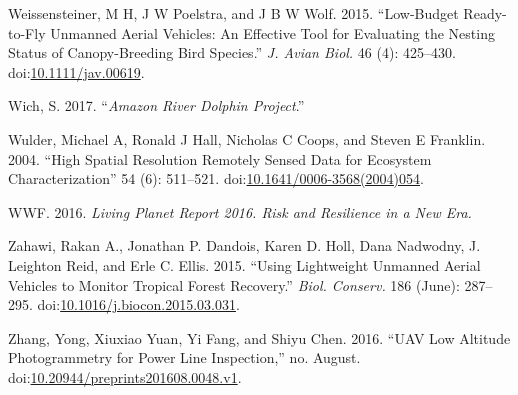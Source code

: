 \documentclass[]{interact}
\theoremstyle{plain}%
\theoremstyle{definition}
\theoremstyle{remark}
\begin{document}
\hypertarget{ref-weissensteiner_low-budget_2015}{}
Weissensteiner, M H, J W Poelstra, and J B W Wolf. 2015. ``Low-Budget
Ready-to-Fly Unmanned Aerial Vehicles: An Effective Tool for Evaluating
the Nesting Status of Canopy-Breeding Bird Species.'' \emph{J. Avian
Biol.} 46 (4): 425--430.
doi:\href{https://doi.org/10.1111/jav.00619}{10.1111/jav.00619}.

\hypertarget{ref-WichS2017}{}
Wich, S. 2017. ``\emph{Amazon River Dolphin Project}.''

\hypertarget{ref-wulder_high_2004}{}
Wulder, Michael A, Ronald J Hall, Nicholas C Coops, and Steven E
Franklin. 2004. ``High Spatial Resolution Remotely Sensed Data for
Ecosystem Characterization'' 54 (6): 511--521.
doi:\href{https://doi.org/10.1641/0006-3568(2004)054}{10.1641/0006-3568(2004)054}.

\hypertarget{ref-wwf_living_2016}{}
WWF. 2016. \emph{Living Planet Report 2016. Risk and Resilience in a New
Era.}

\hypertarget{ref-zahawi_using_2015}{}
Zahawi, Rakan A., Jonathan P. Dandois, Karen D. Holl, Dana Nadwodny, J.
Leighton Reid, and Erle C. Ellis. 2015. ``Using Lightweight Unmanned
Aerial Vehicles to Monitor Tropical Forest Recovery.'' \emph{Biol.
Conserv.} 186 (June): 287--295.
doi:\href{https://doi.org/10.1016/j.biocon.2015.03.031}{10.1016/j.biocon.2015.03.031}.

\hypertarget{ref-zhang_uav_2016}{}
Zhang, Yong, Xiuxiao Yuan, Yi Fang, and Shiyu Chen. 2016. ``UAV Low
Altitude Photogrammetry for Power Line Inspection,'' no. August.
doi:\href{https://doi.org/10.20944/preprints201608.0048.v1}{10.20944/preprints201608.0048.v1}.

\newpage
\singlespacing 
\end{document}
